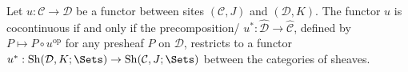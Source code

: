 \begin{proposition} \label{proposition:functor_between_sites_is_cocontinuous_if_and_only_if_precomposition_functor_sends_sheaves_to_sheaves}
Let $u: \mathcal{C} \to \mathcal{D}$ be a functor between sites $(\mathcal{C}, J)$ and $(\mathcal{D}, K)$. The functor $u$ is cocontinuous if and only if the precomposition/ $u^*: \widehat{\mathcal{D}} \to \widehat{\mathcal{C}}$, defined by $P \mapsto P \circ u^{\operatorname{op}}$ for any presheaf $P$ on $\mathcal{D}$, restricts to a functor $u^*: \operatorname{Sh}(\mathcal{D}, K; \Sets) \to \operatorname{Sh}(\mathcal{C}, J; \Sets)$ between the categories of sheaves.
\end{proposition}